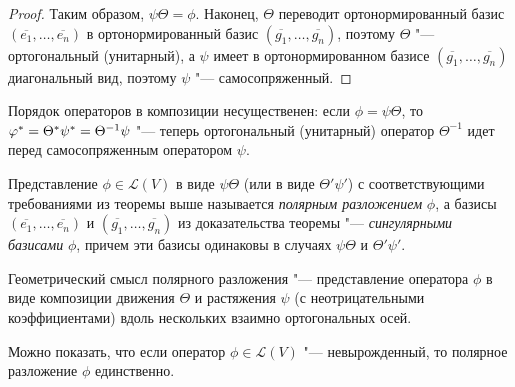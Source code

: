 \begin{proof}
	Таким образом, $\psi\Theta = \phi$. Наконец, $\Theta$ переводит ортонормированный базис $(\overline{e_1}, \dots, \overline{e_n})$ в ортонормированный базис $(\overline{g_1}, \dots, \overline{g_n})$, поэтому $\Theta$ "--- ортогональный (унитарный), а $\psi$ имеет в ортонормированном базисе $(\overline{g_1}, \dots, \overline{g_n})$ диагональный вид, поэтому $\psi$ "--- самосопряженный.
\end{proof}

\begin{note}
	Порядок операторов в композиции несущественен: если $\phi = \psi\Theta$, то $\phi^* \hm= \Theta^*\psi^* = \Theta^{-1}\psi$ "--- теперь ортогональный (унитарный) оператор $\Theta^{-1}$ идет перед самосопряженным оператором $\psi$.
\end{note}

\begin{definition}
	Представление $\phi \in \mathcal{L}(V)$ в виде $\psi\Theta$ (или в виде $\Theta'\psi'$) с соответствующими требованиями из теоремы выше называется \textit{полярным разложением} $\phi$, а базисы $(\overline{e_1}, \dots, \overline{e_n})$ и $(\overline{g_1}, \dots, \overline{g_n})$ из доказательства теоремы "--- \textit{сингулярными базисами} $\phi$, причем эти базисы одинаковы в случаях $\psi\Theta$ и $\Theta'\psi'$.
\end{definition}

\begin{note}
	Геометрический смысл полярного разложения "--- представление оператора $\phi$ в виде композиции движения $\Theta$ и растяжения $\psi$ (с неотрицательными коэффициентами) вдоль нескольких взаимно ортогональных осей.
\end{note}

\begin{note}
	Можно показать, что если оператор $\phi \in \mathcal{L}(V)$ "--- невырожденный, то полярное разложение $\phi$ единственно.
\end{note}
